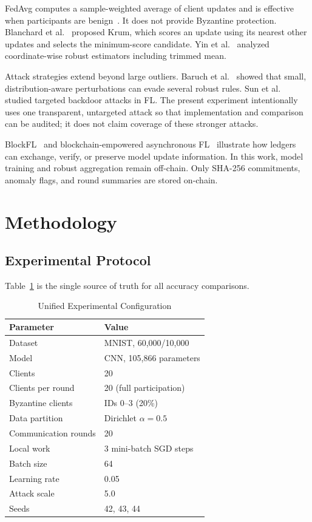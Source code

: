 \documentclass[10pt,letterpaper]{article}
\begin{document}
FedAvg computes a sample-weighted average of client updates and is effective
when participants are benign~\cite{mcmahan2017}. It does not provide Byzantine
protection. Blanchard et al.~\cite{blanchard2017} proposed Krum, which scores an
update using its nearest other updates and selects the minimum-score candidate.
Yin et al.~\cite{yin2018} analyzed coordinate-wise robust estimators including
trimmed mean.

Attack strategies extend beyond large outliers. Baruch et
al.~\cite{baruch2019} showed that small, distribution-aware perturbations can
evade several robust rules. Sun et al.~\cite{sun2019} studied targeted backdoor
attacks in FL. The present experiment intentionally uses one transparent,
untargeted attack so that implementation and comparison can be audited; it
does not claim coverage of these stronger attacks.

BlockFL~\cite{kim2020} and blockchain-empowered asynchronous
FL~\cite{lu2020} illustrate how ledgers can exchange, verify, or preserve model
update information. In this work, model training and robust aggregation remain
off-chain. Only SHA-256 commitments, anomaly flags, and round summaries are
stored on-chain.

\section{Methodology}

\subsection{Experimental Protocol}

Table~\ref{tab:configuration} is the single source of truth for all accuracy
comparisons.

\begin{table}[t]
\caption{Unified Experimental Configuration}
\label{tab:configuration}
\centering
\small
\begin{tabular}{ll}
\toprule
Parameter & Value\\
\midrule
Dataset & MNIST, 60,000/10,000\\
Model & CNN, 105,866 parameters\\
Clients & 20\\
Clients per round & 20 (full participation)\\
Byzantine clients & IDs 0--3 (20\%)\\
Data partition & Dirichlet $\alpha=0.5$\\
Communication rounds & 20\\
Local work & 3 mini-batch SGD steps\\
Batch size & 64\\
Learning rate & 0.05\\
Attack scale & 5.0\\
Seeds & 42, 43, 44\\
\bottomrule
\end{tabular}
\end{table}
\end{document}
